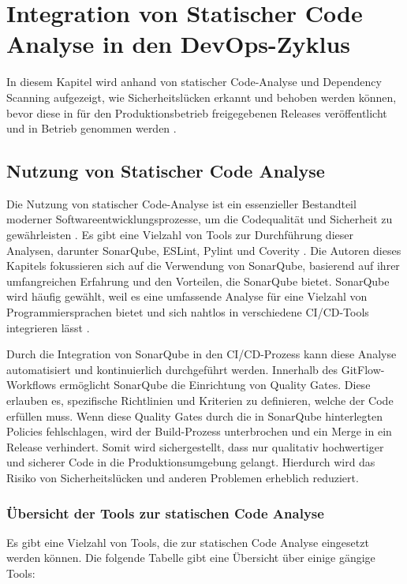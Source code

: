 \section{Integration von Statischer Code Analyse in den DevOps-Zyklus}
In diesem Kapitel wird anhand von statischer Code-Analyse und Dependency Scanning aufgezeigt, wie Sicherheitslücken erkannt und behoben werden können, bevor diese in für den Produktionsbetrieb freigegebenen Releases veröffentlicht und in Betrieb genommen werden \cite{vassallo2021continuous}.

\subsection{Nutzung von Statischer Code Analyse}
Die Nutzung von statischer Code-Analyse ist ein essenzieller Bestandteil moderner Softwareentwicklungsprozesse, um die Codequalität und Sicherheit zu gewährleisten \cite{loukides2021software}. Es gibt eine Vielzahl von Tools zur Durchführung dieser Analysen, darunter SonarQube, ESLint, Pylint und Coverity \cite{vassallo2021continuous}. Die Autoren dieses Kapitels fokussieren sich auf die Verwendung von SonarQube, basierend auf ihrer umfangreichen Erfahrung und den Vorteilen, die SonarQube bietet. SonarQube wird häufig gewählt, weil es eine umfassende Analyse für eine Vielzahl von Programmiersprachen bietet und sich nahtlos in verschiedene CI/CD-Tools integrieren lässt \cite{sonarqube2021docs}.

Durch die Integration von SonarQube in den CI/CD-Prozess kann diese Analyse automatisiert und kontinuierlich durchgeführt werden. Innerhalb des GitFlow-Workflows ermöglicht SonarQube  die Einrichtung von Quality Gates. Diese erlauben es, spezifische Richtlinien und Kriterien zu definieren, welche der Code erfüllen muss. Wenn diese Quality Gates durch die in SonarQube hinterlegten Policies fehlschlagen, wird der Build-Prozess unterbrochen und ein Merge in ein Release verhindert. Somit wird sichergestellt, dass nur qualitativ hochwertiger und sicherer Code in die Produktionsumgebung gelangt. Hierdurch wird das Risiko von Sicherheitslücken und anderen Problemen erheblich reduziert.

\subsubsection{Übersicht der Tools zur statischen Code Analyse}

Es gibt eine Vielzahl von Tools, die zur statischen Code Analyse eingesetzt werden können. Die folgende Tabelle gibt eine Übersicht über einige gängige Tools:

